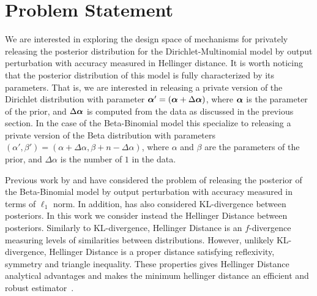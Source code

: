 \documentclass{article}
\begin{document}
\section{Problem Statement}
\label{subsec_problem}
We are interested in exploring the design space of mechanisms for privately releasing the posterior
distribution for the Dirichlet-Multinomial model by output
perturbation with accuracy measured in Hellinger distance.
It is worth noticing that the posterior distribution of this model is fully characterized
by its parameters. That is, we are interested in releasing a private version of
the Dirichlet distribution with parameter
$\boldsymbol{\alpha}'=(\boldsymbol{\alpha} + \Delta \boldsymbol{\alpha})$, where $\boldsymbol{\alpha}$ is the
parameter of the prior, and $\Delta \boldsymbol{\alpha}$ is computed from the data
as discussed in the previous section. In the case of the
Beta-Binomial model this specialize to releasing a private version of the Beta distribution with 
parameters $(\alpha',\beta')=(\alpha + \Delta \alpha,\beta + n -
\Delta \alpha)$, where $\alpha$ and $\beta$ are the parameters of the
prior, and $\Delta \alpha$ is the number of $1$ in the data.


Previous work by \citet{zhang2016differential} and \citet{xiao2012bayesian}
have considered the problem of releasing the posterior of the
Beta-Binomial model by output perturbation with accuracy measured in terms of
$\ell_1$ norm. In addition,   \citet{zhang2016differential} has also
considered KL-divergence between posteriors. 
In this work we consider instead the Hellinger Distance between
posteriors. Similarly to KL-divergence, Hellinger Distance is an
$f$-divergence measuring levels of similarities between
distributions. However, unlikely KL-divergence, Hellinger Distance is a proper
distance satisfying reflexivity, symmetry and triangle
inequality. These properties gives Hellinger Distance analytical
advantages and makes the minimum hellinger distance  an efficient and
robust estimator~\cite{}.
\end{document}
